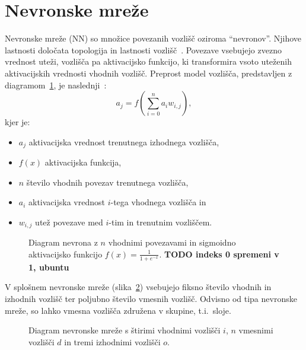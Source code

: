 \documentclass[a4paper,12pt,openright]{book}
\begin{document}
    \section{Nevronske mreže}\label{sec:nevronske-mreze}
    Nevronske mreže (NN) so množice povezanih vozlišč oziroma \enquote{nevronov}.
    Njihove lastnosti določata topologija in lastnosti vozlišč~\cite{russell_norvig_2016}.
    Povezave vsebujejo zvezno vrednost uteži, vozlišča pa aktivacijsko funkcijo, ki transformira vsoto uteženih
    aktivacijskih vrednosti vhodnih vozlišč.
    Preprost model vozlišča, predstavljen z diagramom~\ref{fig:diagram-nevrona}, je naslednji~\cite{russell_norvig_2016}:
    \begin{equation}
        a_j=f(\sum_{i=0}^{n} a_i w_{i,j}),
        \label{eq:neuron_model_splosno}
    \end{equation}
    kjer je:
    \begin{itemize}
        \item $a_j$ aktivacijska vrednost trenutnega izhodnega vozlišča,
        \item $f(x)$ aktivacijska funkcija,
        \item $n$ število vhodnih povezav trenutnega vozlišča,
        \item $a_i$ aktivacijska vrednost $i$-tega vhodnega vozlišča in
        \item $w_{i,j}$ utež povezave med $i$-tim in trenutnim vozliščem.
    \end{itemize}

    \begin{figure}[H]
        \begin{center}
            
        \end{center}
        \caption{Diagram nevrona z $n$ vhodnimi povezavami in sigmoidno aktivacijsko funkcijo $f( x) =\frac{1}{1+e^{-x}}$. \textbf{TODO indeks 0 spremeni v 1, ubuntu}}
        \label{fig:diagram-nevrona}
    \end{figure}

    V splošnem nevronske mreže (slika~\ref{fig:diagram-mreze}) vsebujejo fiksno število vhodnih in izhodnih vozlišč ter poljubno število vmesnih vozlišč.
    Odvisno od tipa nevronske mreže, so lahko vmesna vozlišča združena v skupine, t.i.\ sloje.

    \begin{figure}[H]
        \begin{center}
            
        \end{center}
        \caption{Diagram nevronske mreže s štirimi vhodnimi vozlišči $i$, $n$ vmesnimi vozlišči $d$ in tremi izhodnimi vozlišči $o$.}
        \label{fig:diagram-mreze}
    \end{figure}
\end{document}
